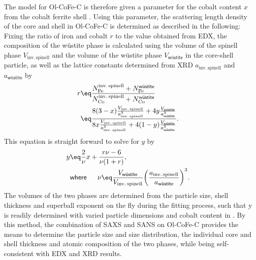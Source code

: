 \documentclass[\main/dresen_thesis.tex]{subfiles}
\begin{document}
    The model for Ol-CoFe-C is therefore given a parameter for the cobalt content $x$ from the cobalt ferrite shell .
    Using this parameter, the scattering length density of the core and shell in Ol-CoFe-C is determined as described in the following:
    Fixing the ratio of iron and cobalt $r$ to the value obtained from EDX, the composition of the w\"ustite phase  is calculated using the volume of the spinell phase $V_\mathrm{inv.\,spinell}$ and the volume of the w\"ustite phase $V_\textsf{w\"ustite}$ in the core-shell particle, as well as the lattice constants determined from XRD $a_\mathrm{inv.\,spinell}$ and $a_\textsf{w\"ustite}$ by
    \begin{align}
      \begin{split}
        r &\eq \frac{N_\mathrm{Fe}^\mathrm{inv.\, spinell} + N_\mathrm{Fe}^\textsf{w\"ustite}}
                    {N_\mathrm{Co}^\mathrm{inv.\, spinell} + N_\mathrm{Co}^\textsf{w\"ustite}} \\
          &\eq \frac
                 {8 (3-x) \frac{V_\mathrm{inv.\,spinell}}{a_\mathrm{inv.\,spinell}^3} +
                  4 y \frac{V_\textsf{w\"ustite}}{a_\textsf{w\"ustite}^3}}
                 {8 x \frac{V_\mathrm{inv.\,spinell}}{a_\mathrm{inv.\,spinell}^3} +
                  4 (1-y) \frac{V_\textsf{w\"ustite}}{a_\textsf{w\"ustite}^3}}.
      \end{split}
    \end{align}
    This equation is straight forward to solve for $y$ by
    \begin{align}
      y &\eq \frac{2}{\nu} x + \frac{r \nu - 6}{\nu (1 + r)},\\
        & \textsf{where\,} \hspace{0.5cm} \nu \eq \frac{V_\textsf{w\"ustite}}{V_\mathrm{inv.\,spinell}} \biggl( \frac{a_\mathrm{inv.\,spinell}}{a_\textsf{w\"ustite}} \biggr)^3.
    \end{align}
    The volumes of the two phases are determined from the particle size, shell thickness and superball exponent on the fly during the fitting process, such that y is readily determined with varied particle dimensions and cobalt content in .
    By this method, the combination of SAXS and SANS on Ol-CoFe-C provides the means to determine the particle size and size distribution, the individual core and shell thickness and atomic composition of the two phases, while being self-consistent with EDX and XRD results.
\end{document}
